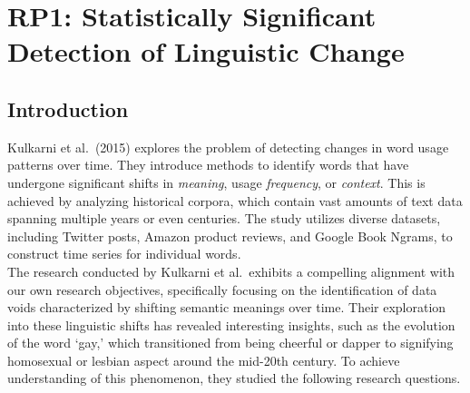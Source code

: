 
\section{RP1: Statistically Significant Detection of Linguistic Change} \label{sec:paper_kulkarni}
\subsection{Introduction} \label{subsec:kulkarni_introduction}

Kulkarni et al.\ (2015) explores the problem of detecting changes in word usage patterns over time.
They introduce methods to identify words that have undergone significant shifts in \emph{meaning}, usage \emph{frequency}, or \emph{context}.
This is achieved by analyzing historical corpora, which contain vast amounts of text data spanning multiple years or even centuries.
The study utilizes diverse datasets, including Twitter posts, Amazon product reviews, and Google Book Ngrams, to construct time series for individual words.\\
The research conducted by Kulkarni et al.\ exhibits a compelling alignment with our own research objectives,
specifically focusing on the identification of data voids characterized by shifting semantic meanings over time.
Their exploration into these linguistic shifts has revealed interesting insights, such as the evolution of the word `gay,'
which transitioned from being cheerful or dapper to signifying homosexual or lesbian aspect around the mid-20th century.
To achieve understanding of this phenomenon, they studied the following research questions.
